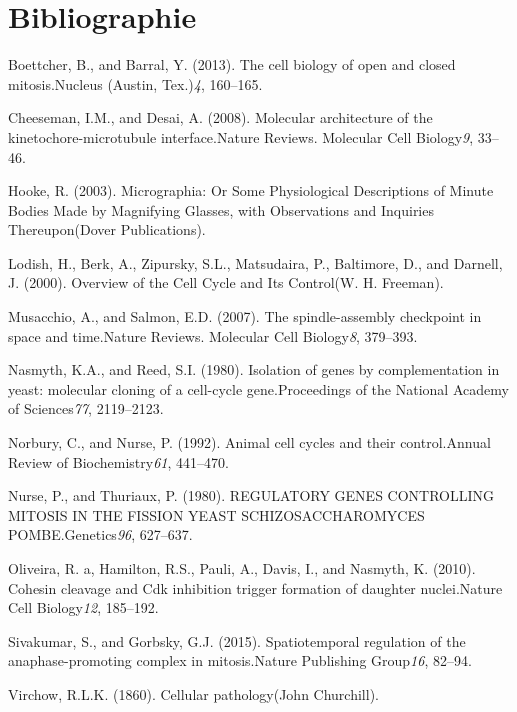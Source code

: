 \documentclass[12pt,a4paper,twoside,openright]{book}
\begin{document}
\backmatter

\chapter{Bibliographie}\label{bibliographie}



Boettcher, B., and Barral, Y. (2013). The cell biology of open and
closed mitosis.Nucleus (Austin, Tex.)\emph{4}, 160--165.

Cheeseman, I.M., and Desai, A. (2008). Molecular architecture of the
kinetochore-microtubule interface.Nature Reviews. Molecular Cell
Biology\emph{9}, 33--46.

Hooke, R. (2003). Micrographia: Or Some Physiological Descriptions of
Minute Bodies Made by Magnifying Glasses, with Observations and
Inquiries Thereupon(Dover Publications).

Lodish, H., Berk, A., Zipursky, S.L., Matsudaira, P., Baltimore, D., and
Darnell, J. (2000). Overview of the Cell Cycle and Its Control(W. H.
Freeman).

Musacchio, A., and Salmon, E.D. (2007). The spindle-assembly checkpoint
in space and time.Nature Reviews. Molecular Cell Biology\emph{8},
379--393.

Nasmyth, K.A., and Reed, S.I. (1980). Isolation of genes by
complementation in yeast: molecular cloning of a cell-cycle
gene.Proceedings of the National Academy of Sciences\emph{77},
2119--2123.

Norbury, C., and Nurse, P. (1992). Animal cell cycles and their
control.Annual Review of Biochemistry\emph{61}, 441--470.

Nurse, P., and Thuriaux, P. (1980). REGULATORY GENES CONTROLLING MITOSIS
IN THE FISSION YEAST SCHIZOSACCHAROMYCES POMBE.Genetics\emph{96},
627--637.

Oliveira, R. a, Hamilton, R.S., Pauli, A., Davis, I., and Nasmyth, K.
(2010). Cohesin cleavage and Cdk inhibition trigger formation of
daughter nuclei.Nature Cell Biology\emph{12}, 185--192.

Sivakumar, S., and Gorbsky, G.J. (2015). Spatiotemporal regulation of
the anaphase-promoting complex in mitosis.Nature Publishing
Group\emph{16}, 82--94.

Virchow, R.L.K. (1860). Cellular pathology(John Churchill).
\end{document}
